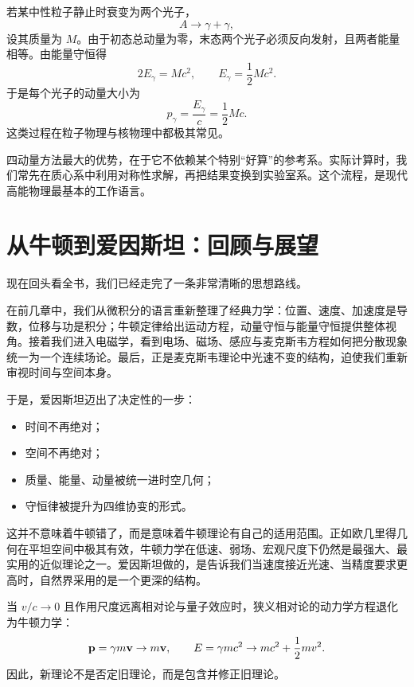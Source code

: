 \begin{example}[母粒子静止系中的双光子衰变]
若某中性粒子静止时衰变为两个光子，
\[
A\to \gamma+\gamma,
\]
设其质量为 $M$。由于初态总动量为零，末态两个光子必须反向发射，且两者能量相等。由能量守恒得
\[
2E_\gamma = Mc^2,
\qquad
E_\gamma = \frac12 Mc^2.
\]
于是每个光子的动量大小为
\[
p_\gamma = \frac{E_\gamma}{c}=\frac12 Mc.
\]
这类过程在粒子物理与核物理中都极其常见。
\end{example}

\begin{remark}
四动量方法最大的优势，在于它不依赖某个特别“好算”的参考系。实际计算时，我们常先在质心系中利用对称性求解，再把结果变换到实验室系。这个流程，是现代高能物理最基本的工作语言。
\end{remark}

\section{从牛顿到爱因斯坦：回顾与展望}

现在回头看全书，我们已经走完了一条非常清晰的思想路线。

在前几章中，我们从微积分的语言重新整理了经典力学：位置、速度、加速度是导数，位移与功是积分；牛顿定律给出运动方程，动量守恒与能量守恒提供整体视角。接着我们进入电磁学，看到电场、磁场、感应与麦克斯韦方程如何把分散现象统一为一个连续场论。最后，正是麦克斯韦理论中光速不变的结构，迫使我们重新审视时间与空间本身。

于是，爱因斯坦迈出了决定性的一步：
\begin{itemize}
  \item 时间不再绝对；
  \item 空间不再绝对；
  \item 质量、能量、动量被统一进时空几何；
  \item 守恒律被提升为四维协变的形式。
\end{itemize}

这并不意味着牛顿错了，而是意味着牛顿理论有自己的适用范围。正如欧几里得几何在平坦空间中极其有效，牛顿力学在低速、弱场、宏观尺度下仍然是最强大、最实用的近似理论之一。爱因斯坦做的，是告诉我们当速度接近光速、当精度要求更高时，自然界采用的是一个更深的结构。

\begin{theorem}[经典极限原则]
当 $v/c\to 0$ 且作用尺度远离相对论与量子效应时，狭义相对论的动力学方程退化为牛顿力学：
\[
\vb{p}=\gamma m\vb{v}\to m\vb{v},
\qquad
E=\gamma mc^2 \to mc^2 + \frac12 mv^2.
\]
因此，新理论不是否定旧理论，而是包含并修正旧理论。
\end{theorem}

